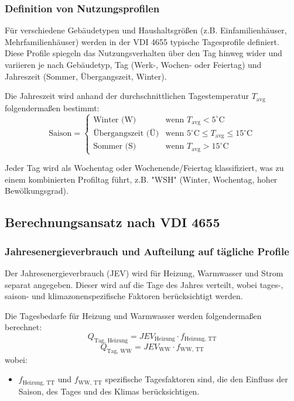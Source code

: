 \subsubsection{Definition von Nutzungsprofilen}
Für verschiedene Gebäudetypen und Haushaltsgrößen (z.B. Einfamilienhäuser, Mehrfamilienhäuser) werden in der VDI 4655 typische Tagesprofile definiert. Diese Profile spiegeln das Nutzungsverhalten über den Tag hinweg wider und variieren je nach Gebäudetyp, Tag (Werk-, Wochen- oder Feiertag) und Jahreszeit (Sommer, Übergangszeit, Winter).

Die Jahreszeit wird anhand der durchschnittlichen Tagestemperatur \( T_{\text{avg}} \) folgendermaßen bestimmt:
\[
\text{Saison} = 
\begin{cases} 
\text{Winter (W)} & \text{wenn } T_{\text{avg}} < 5^\circ\text{C} \\
\text{Übergangszeit (Ü)} & \text{wenn } 5^\circ\text{C} \leq T_{\text{avg}} \leq 15^\circ\text{C} \\
\text{Sommer (S)} & \text{wenn } T_{\text{avg}} > 15^\circ\text{C} 
\end{cases}
\]

Jeder Tag wird als Wochentag oder Wochenende/Feiertag klassifiziert, was zu einem kombinierten Profiltag führt, z.B. "WSH" (Winter, Wochentag, hoher Bewölkungsgrad).

\subsection{Berechnungsansatz nach VDI 4655}

\subsubsection{Jahresenergieverbrauch und Aufteilung auf tägliche Profile}
Der Jahresenergieverbrauch (JEV) wird für Heizung, Warmwasser und Strom separat angegeben. Dieser wird auf die Tage des Jahres verteilt, wobei tages-, saison- und klimazonenspezifische Faktoren berücksichtigt werden. 

Die Tagesbedarfe für Heizung und Warmwasser werden folgendermaßen berechnet:
\[
Q_{\text{Tag, Heizung}} = JEV_{\text{Heizung}} \cdot f_{\text{Heizung, TT}} 
\]
\[
Q_{\text{Tag, WW}} = JEV_{\text{WW}} \cdot f_{\text{WW, TT}} 
\]
wobei:
\begin{itemize}
    \item \( f_{\text{Heizung, TT}} \) und \( f_{\text{WW, TT}} \) spezifische Tagesfaktoren sind, die den Einfluss der Saison, des Tages und des Klimas berücksichtigen.
\end{itemize}

